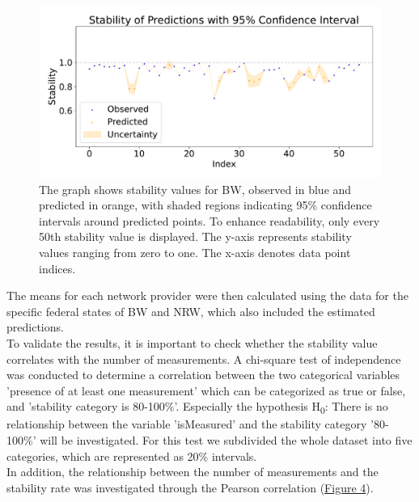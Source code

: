 \documentclass{article}
\theoremstyle{plain}
\theoremstyle{definition}
\theoremstyle{remark}
\begin{document}
\begin{figure}[H]
\vskip 0.2in
\begin{center}
\centerline{\includegraphics[width=\columnwidth]{gauss.pdf}}
\caption{The graph shows stability values for \gls*{BW}, observed in blue and predicted in orange, with shaded regions indicating 95\% confidence intervals around predicted points. 
To enhance readability, only every 50th stability value is displayed. The y-axis represents stability values ranging from zero to one. The x-axis denotes data point indices.}
\label{fig:confidence}
\end{center}
\vskip -0.2in
\end{figure}
The means for each network provider were then calculated using the data for the specific federal states of \gls*{BW} and \gls*{NRW}, which also included the estimated predictions.
\\
\newline
To validate the results, it is important to check whether the stability value correlates with the number of measurements. A chi-square test of independence was conducted to determine a correlation between the two categorical variables 'presence of at least one measurement' which can be categorized as true or false, and 'stability category is 80-100\%'. Especially the hypothesis H\textsubscript{0}: There is no relationship between the variable 'isMeasured' and the stability category '80-100\%' will be investigated. For this test we subdivided the whole dataset into five categories, which are represented as 20\% intervals.\\
In addition, the relationship between the number of measurements and the stability rate was investigated through the Pearson correlation (\hyperref[fig:pearson]{Figure 4}).
\end{document}
